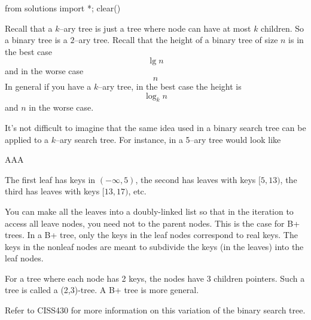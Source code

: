 \begin{python0}
from solutions import *; clear()
\end{python0}

Recall that a $k$--ary tree is just a tree where node can have
at most $k$ children.
So a binary tree is a $2$--ary tree.
Recall that the height of a binary tree of size $n$ is in the best case
\[
\lg n
\]
and in the worse case
\[
n
\]
In general if you have a $k$--ary tree, in the best case the height is
\[
\log_k n
\]
and $n$ in the worse case.

It's not difficult to imagine that the same idea used in a
binary search tree can be applied to a
$k$--ary search tree. For instance, in a 5--ary tree would look like

AAA


The first leaf has keys in $(-\infty, 5)$,
the second has leaves with keys $[5, 13)$,
the third has leaves with keys $[13, 17)$, etc.

You can make all the leaves into a doubly-linked list
so that in the iteration to access all leave nodes, you need not
to the parent nodes.
This is the case for B+ trees.
In a B+ tree, only the keys in the leaf nodes correspond to real keys.
The keys in the nonleaf nodes are meant to subdivide the keys (in the leaves)
into the leaf nodes.

For a tree where each node has 2 keys, the nodes have 3 children pointers.
Such a tree is called a (2,3)-tree.
A B+ tree is more general.

Refer to CISS430 for more information on this variation of the binary
search tree.

